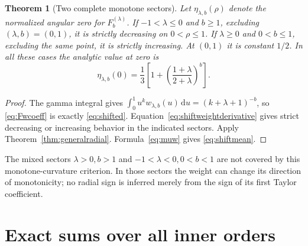 \documentclass[11pt]{article}
\numberwithin{equation}{section}
\newtheorem{theorem}{Theorem}[section]
\theoremstyle{definition}
\theoremstyle{remark}
\newcommand{\dd}{\,\mathrm d}
\begin{document}
\begin{theorem}[Two complete monotone sectors]\label{thm:shift}
Let $\eta_{\lambda,b}(\rho)$ denote the normalized angular zero for
$F_b^{(\lambda)}$. If $-1<\lambda\le0$ and $b\ge1$, excluding
$(\lambda,b)=(0,1)$, it is strictly decreasing on $0<\rho\le1$.
If $\lambda\ge0$ and $0<b\le1$, excluding the same point, it is
strictly increasing. At $(0,1)$ it is constant $1/2$.
In all these cases the analytic value at zero is
\begin{equation}\label{eq:shiftmean}
 \eta_{\lambda,b}(0)=\frac13\left[
        1+\left(\frac{1+\lambda}{2+\lambda}\right)^b\right].
\end{equation}
\end{theorem}
\begin{proof}
The gamma integral gives
$\int_0^1u^k w_{\lambda,b}(u)\dd u=(k+\lambda+1)^{-b}$,
so \eqref{eq:Fwcoeff} is exactly \eqref{eq:shifted}.
Equation~\eqref{eq:shiftweightderivative} gives strict decreasing or
increasing behavior in the indicated sectors. Apply
Theorem~\ref{thm:generalradial}. Formula~\eqref{eq:muw} gives
\eqref{eq:shiftmean}.
\end{proof}

The mixed sectors $\lambda>0,b>1$ and $-1<\lambda<0,0<b<1$ are not
covered by this monotone-curvature criterion. In those sectors the
weight can change its direction of monotonicity; no radial sign is
inferred merely from the sign of its first Taylor coefficient.

\section{Exact sums over all inner orders}
\label{sec:identities}
\end{document}
